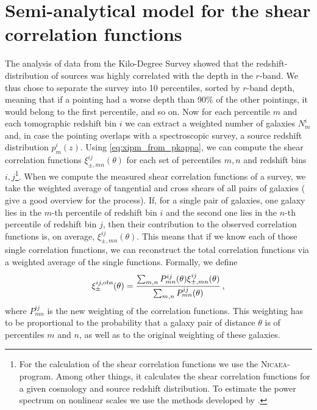 \section{Semi-analytical model for the shear correlation functions}
\label{sec:xipm_semianalytic}
The analysis of data from the Kilo-Degree Survey showed that the redshift-distribution of sources was highly correlated with the depth in the $r$-band. We thus chose to separate the survey into 10 percentiles, sorted by $r$-band depth, meaning that if a pointing had a worse depth than 90\% of the other pointings, it would belong to the first percentile, and so on. Now for each percentile $m$ and each tomographic redshift bin $i$ we can extract a weighted number of galaxies $N^i_m$ and, in case the pointing overlaps with a spectroscopic survey, a source redshift distribution $p^i_m(z)$. Using \eqref{eq:xipm_from_pkappa}, we can compute the shear correlation functions $\xi_{\pm,mn}^{ij}(\theta)$ for each set of percentiles $m,n$ and redshift bins $i,j$\footnote{For the calculation of the shear correlation functions we use the \textsc{Nicaea}-program. Among other things, it calculates the shear correlation functions for a given cosmology and source redshift distribution. To estimate the power spectrum on nonlinear scales we use the methods developed by \citet{2012ApJ...761..152T}.}. When we compute the measured shear correlation functions of a survey, we take the weighted average of tangential and cross shears of all pairs of galaxies (\citet{2017MNRAS.465.1454H} give a good overview for the process). If, for a single pair of galaxies, one galaxy lies in the $m$-th percentile of redshift bin $i$ and the second one lies in the $n$-th percentile of redshift bin $j$, then their contribution to the observed correlation functions is, on average, $\xi_{\pm,mn}^{ij}(\theta)$. This means that if we know each of those single correlation functions, we can reconstruct the total correlation functions via a weighted average of the single functions. Formally, we define \[
\xi_\pm^{ij,\rm{obs}}(\theta) = \frac{\sum_{m,n} P_{mn}^{ij}(\theta)\xi_{\pm,mn}^{ij}(\theta)}{\sum_{m,n} P_{mn}^{ij}(\theta)}\, ,
\label{eq:def_xiobs}
\]
where $P_{mn}^{ij}$ is the new weighting of the correlation functions. This weighting has to be proportional to the probability that a galaxy pair of distance $\theta$ is of percentiles $m$ and $n$, as well as to the original weighting of these galaxies.

